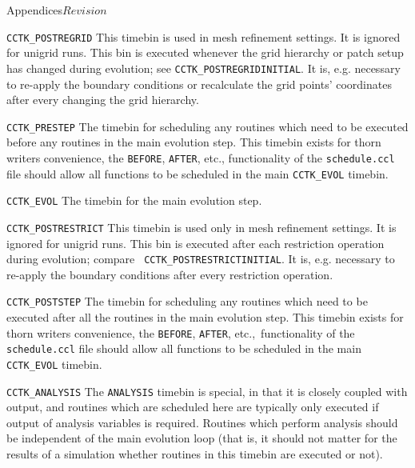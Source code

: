 \begin{cactuspart}{Appendices}{}{$Revision$}
\begin{Lentry}
\item[{\tt CCTK\_POSTREGRID}]
        This timebin is used in mesh refinement settings.  It is
        ignored for unigrid runs.  This bin is executed whenever the
        grid hierarchy or patch setup has changed during evolution;
        see {\tt CCTK\_POSTREGRIDINITIAL}.  It is, e.g.
        necessary to re-apply the boundary conditions or recalculate
        the grid points' coordinates after every changing the grid
        hierarchy.
                
\item[{\tt CCTK\_PRESTEP}]
        The timebin for scheduling any routines which need to be 
        executed before any routines in the main evolution step. This 
        timebin exists for thorn writers convenience, the {\tt BEFORE}, 
        {\tt AFTER}, etc., functionality of the {\tt schedule.ccl} file
        should allow all functions to be scheduled in the main {\tt CCTK\_EVOL}
        timebin.
        
\item[{\tt CCTK\_EVOL}]
        The timebin for the main evolution step.
        
\item[{\tt CCTK\_POSTRESTRICT}]
        This timebin is used only in mesh refinement settings.  It is
        ignored for unigrid runs.  This bin is executed after each
        restriction operation during evolution; compare {\tt
          CCTK\_POSTRESTRICTINITIAL}.  It is, e.g. necessary to
        re-apply the
        boundary conditions after every restriction operation.

\item[{\tt CCTK\_POSTSTEP}]
        The timebin for scheduling any routines which need to be 
        executed after all the routines in the main evolution step. This 
        timebin exists for thorn writers convenience, the {\tt BEFORE}, 
        {\tt AFTER}, etc.,\ functionality of the {\tt schedule.ccl} file
        should allow all functions to be scheduled in the main {\tt CCTK\_EVOL}
        timebin.

\item[{\tt CCTK\_ANALYSIS}]
        The {\tt ANALYSIS} timebin is special, in that it is closely coupled 
        with output, and routines which are scheduled here are typically
        only executed if output of analysis variables is required. 
        Routines which perform analysis should be independent of the main 
        evolution loop (that is, it should not matter for the results
        of a simulation whether routines in this timebin are executed or 
        not). 


\end{Lentry}
\end{cactuspart}
